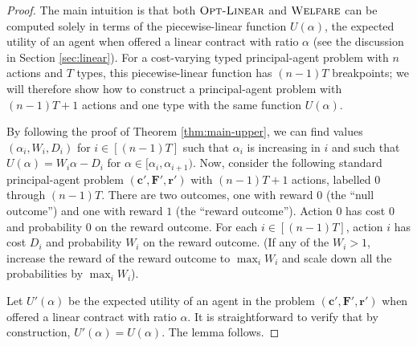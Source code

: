 \documentclass{article}
\newcommand{\costvector}{\bm{c}}
\newcommand{\ForecastTensor}{\bm{F}}
\newcommand{\rewardvector}{\bm{r}}
\newcommand{\PrincipalAgentProblemPrime}{\left(\costvector', \ForecastTensor', \rewardvector'\right)}
\newcommand{\OWelfare}{\textsc{Welfare}}
\newcommand{\OLinear}{\textsc{Opt-Linear}}
\begin{document}
\begin{proof}
The main intuition is that both $\OLinear$ and $\OWelfare$ can be computed solely in terms of the piecewise-linear function $U(\alpha)$, the expected utility of an agent when offered a linear contract with ratio $\alpha$ (see the discussion in Section \ref{sec:linear}). For a cost-varying typed principal-agent problem with $n$ actions and $T$ types, this piecewise-linear function has $(n-1)T$ breakpoints; we will therefore show how to construct a principal-agent problem with $(n-1)T+1$ actions and one type with the same function $U(\alpha)$.

By following the proof of Theorem \ref{thm:main-upper}, we can find values $(\alpha_i, W_i, D_i)$ for $i \in [(n-1)T]$ such that $\alpha_i$ is increasing in $i$ and such that $U(\alpha) = W_i\alpha - D_i$ for $\alpha \in [\alpha_i, \alpha_{i+1})$. Now, consider the following standard principal-agent problem $\PrincipalAgentProblemPrime$ with $(n-1)T+1$ actions, labelled $0$ through $(n-1)T$. There are two outcomes, one with reward $0$ (the ``null outcome'') and one with reward $1$ (the ``reward outcome''). Action $0$ has cost $0$ and probability $0$ on the reward outcome. For each $i \in [(n-1)T]$, action $i$ has cost $D_i$ and probability $W_i$ on the reward outcome. (If any of the $W_i > 1$, increase the reward of the reward outcome to $\max_i W_i$ and scale down all the probabilities by $\max_{i} W_i$). 

Let $U'(\alpha)$ be the expected utility of an agent in the problem $\PrincipalAgentProblemPrime$ when offered a linear contract with ratio $\alpha$. It is straightforward to verify that by construction, $U'(\alpha) = U(\alpha)$. The lemma follows.


\end{proof}
\end{document}
